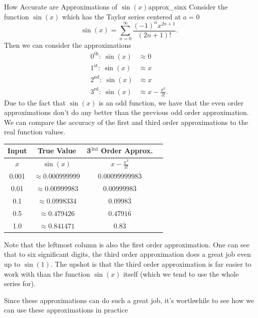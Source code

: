 \begin{ex}{How Accurate are Approximations of $\sin(x)$}{approx_sinx}
Consider the function $\sin(x)$ which has the Taylor series centered at $a=0$
\[
\sin(x) = \sum_{n=0}^\infty \frac{(-1)^n x^{2n+1}}{(2n+1)!}.
\]
Then we can consider the approximations
\begin{align*}
    0^\textrm{th}:~\sin(x)&\approx 0\\
    1^\textrm{st}:~\sin(x)&\approx x\\
    2^\textrm{nd}:~\sin(x)&\approx x\\
    3^\textrm{rd}:~\sin(x)&\approx x-\frac{x^3}{3!}.
\end{align*}
Due to the fact that $\sin(x)$ is an odd function, we have that the even order approximations don't do any better than the previous odd order approximation.  We can compare the accuracy of the first and third order approximations to the real function values.
    \begin{table}[H]
        \centering
        \renewcommand{\arraystretch}{1.5}
        \begin{tabular}{c|c|c|c}
            Input & True Value & 3$^\textrm{3rd}$ Order Approx.\\
            \hline
            $x$ & $\sin(x)$ & $x-\frac{x^3}{3!}$\\
            \hline
            0.001 & $\approx 0.000999999$ & $0.0009999998\overline{3}$\\
            \hline
            0.01 &  $\approx 0.00999983$ & $0.0099998\overline{3}$\\
            \hline
            0.1 &  $\approx 0.0998334$ & $0.0998\overline{3}$\\
            \hline
            0.5 & $\approx 0.479426$ & $0.4791\overline{6}$\\
            \hline
            1.0 & $\approx 0.841471$ & $0.8\overline{3}$
        \end{tabular}
        \label{tab:sin_approx}
    \end{table}
    Note that the leftmost column is also the first order approximation. One can see that to six significant digits, the third order approximation does a great job even up to $\sin(1)$.  The upshot is that the third order approximation is far easier to work with than the function $\sin(x)$ itself (which we tend to use the whole series for).
\end{ex}

Since these approximations can do such a great job, it's worthwhile to see how we can use these approximations in practice

